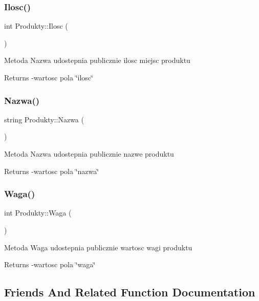 \subsubsection{\texorpdfstring{Ilosc()}{Ilosc()}}
{\footnotesize\ttfamily int Produkty\+::\+Ilosc (\begin{DoxyParamCaption}{ }\end{DoxyParamCaption})}

Metoda Nazwa udostepnia publicznie ilosc miejsc produktu \begin{DoxyReturn}{Returns}
-\/wartosc pola \char`\"{}ilosc\char`\"{} 
\end{DoxyReturn}
\mbox{\label{class_produkty_aa7494624bb7e21ebe813cd3006ec2274}} 
\subsubsection{\texorpdfstring{Nazwa()}{Nazwa()}}
{\footnotesize\ttfamily string Produkty\+::\+Nazwa (\begin{DoxyParamCaption}{ }\end{DoxyParamCaption})}

Metoda Nazwa udostepnia publicznie nazwe produktu \begin{DoxyReturn}{Returns}
-\/wartosc pola \char`\"{}nazwa\char`\"{} 
\end{DoxyReturn}
\mbox{\label{class_produkty_a4ecb609419d9b3f25cf2eecbcacceaa7}} 
\subsubsection{\texorpdfstring{Waga()}{Waga()}}
{\footnotesize\ttfamily int Produkty\+::\+Waga (\begin{DoxyParamCaption}{ }\end{DoxyParamCaption})}

Metoda Waga udostepnia publicznie wartosc wagi produktu \begin{DoxyReturn}{Returns}
-\/wartosc pola \char`\"{}waga\char`\"{} 
\end{DoxyReturn}


\subsection{Friends And Related Function Documentation}
\mbox{\label{class_produkty_a77a78a1dde173eb856628a786d2ca4cc}} 
